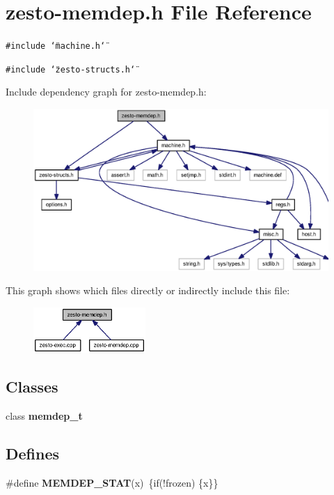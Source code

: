 \section{zesto-memdep.h File Reference}
\label{zesto-memdep_8h}
{\tt \#include \char`\"{}machine.h\char`\"{}}\par
{\tt \#include \char`\"{}zesto-structs.h\char`\"{}}\par


Include dependency graph for zesto-memdep.h:\nopagebreak
\begin{figure}[H]
\begin{center}
\leavevmode
\includegraphics[width=322pt]{zesto-memdep_8h__incl}
\end{center}
\end{figure}


This graph shows which files directly or indirectly include this file:\nopagebreak
\begin{figure}[H]
\begin{center}
\leavevmode
\includegraphics[width=121pt]{zesto-memdep_8h__dep__incl}
\end{center}
\end{figure}
\subsection*{Classes}
\begin{CompactItemize}
\item 
class {\bf memdep\_\-t}
\end{CompactItemize}
\subsection*{Defines}
\begin{CompactItemize}
\item 
\#define {\bf MEMDEP\_\-STAT}(x)~\{if(!frozen) \{x\}\}
\end{CompactItemize}
